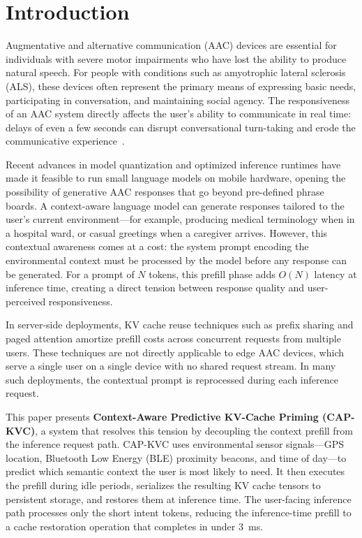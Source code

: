 \section{Introduction}
\label{sec:introduction}

Augmentative and alternative communication (AAC) devices are essential for individuals with severe motor impairments who have lost the ability to produce natural speech. For people with conditions such as amyotrophic lateral sclerosis (ALS), these devices often represent the primary means of expressing basic needs, participating in conversation, and maintaining social agency. The responsiveness of an AAC system directly affects the user's ability to communicate in real time: delays of even a few seconds can disrupt conversational turn-taking and erode the communicative experience~\cite{beukelman2020}.

Recent advances in model quantization and optimized inference runtimes have made it feasible to run small language models on mobile hardware, opening the possibility of generative AAC responses that go beyond pre-defined phrase boards. A context-aware language model can generate responses tailored to the user's current environment---for example, producing medical terminology when in a hospital ward, or casual greetings when a caregiver arrives. However, this contextual awareness comes at a cost: the system prompt encoding the environmental context must be processed by the model before any response can be generated. For a prompt of $N$ tokens, this prefill phase adds $O(N)$ latency at inference time, creating a direct tension between response quality and user-perceived responsiveness.

In server-side deployments, KV cache reuse techniques such as prefix sharing and paged attention amortize prefill costs across concurrent requests from multiple users. These techniques are not directly applicable to edge AAC devices, which serve a single user on a single device with no shared request stream. In many such deployments, the contextual prompt is reprocessed during each inference request.

This paper presents \textbf{Context-Aware Predictive KV-Cache Priming (CAP-KVC)}, a system that resolves this tension by decoupling the context prefill from the inference request path. CAP-KVC uses environmental sensor signals---GPS location, Bluetooth Low Energy (BLE) proximity beacons, and time of day---to predict which semantic context the user is most likely to need. It then executes the prefill during idle periods, serializes the resulting KV cache tensors to persistent storage, and restores them at inference time. The user-facing inference path processes only the short intent tokens, reducing the inference-time prefill to a cache restoration operation that completes in under 3~ms.

